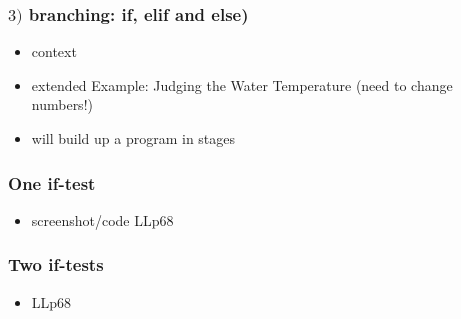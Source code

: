 \documentclass[english,14pt]{beamer}
\begin{document}
%
%
%


\begin{frame}[fragile]

\frametitle{$3)$ branching: if, elif and else)}


\begin{itemize}
	\item context
	\item extended Example: Judging the Water Temperature (need to change numbers!)
	\item will build up a program in stages
\end{itemize}

\end{frame}


\begin{frame}[fragile]

\frametitle{One if-test}

\begin{itemize}
	\item screenshot/code LLp68
\end{itemize}

\end{frame}


\begin{frame}[fragile]

\frametitle{Two if-tests}

\begin{itemize}
	\item LLp68
\end{itemize}

\end{frame}
\end{document}
